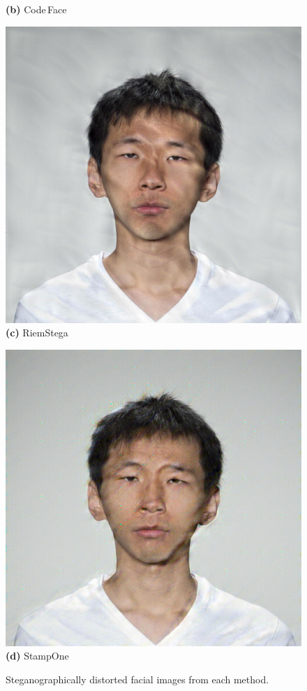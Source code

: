 \begin{figure}[ht]
\begin{minipage}[t]{0.2\textwidth}
        \textbf{(b)} Code\,Face
    \end{minipage}
    \hfill
    \begin{minipage}[t]{0.2\textwidth}
        \centering
        \includegraphics[width=\textwidth]{images/005_RiemStega_1.4.jpg}\\
        \textbf{(c)} RiemStega
    \end{minipage}
    \hfill
    \begin{minipage}[t]{0.2\textwidth}
        \centering
        \includegraphics[width=\textwidth]{images/005_StampOne_1.4.jpg}\\
        \textbf{(d)} StampOne
    \end{minipage}
    \caption{Steganographically distorted facial images from each method.}\label{fig:steganography}
\end{figure}

